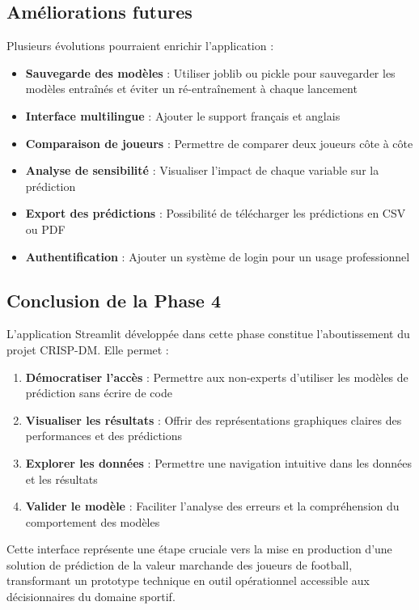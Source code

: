 \documentclass[12pt,a4paper]{article}
\begin{document}
\subsection{Améliorations futures}

Plusieurs évolutions pourraient enrichir l'application :

\begin{itemize}[leftmargin=*]
    \item \textbf{Sauvegarde des modèles} : Utiliser joblib ou pickle pour sauvegarder les modèles entraînés et éviter un ré-entraînement à chaque lancement
    \item \textbf{Interface multilingue} : Ajouter le support français et anglais
    \item \textbf{Comparaison de joueurs} : Permettre de comparer deux joueurs côte à côte
    \item \textbf{Analyse de sensibilité} : Visualiser l'impact de chaque variable sur la prédiction
    \item \textbf{Export des prédictions} : Possibilité de télécharger les prédictions en CSV ou PDF
    \item \textbf{Authentification} : Ajouter un système de login pour un usage professionnel
\end{itemize}

\subsection{Conclusion de la Phase 4}

L'application Streamlit développée dans cette phase constitue l'aboutissement du projet CRISP-DM. Elle permet :

\begin{enumerate}
    \item \textbf{Démocratiser l'accès} : Permettre aux non-experts d'utiliser les modèles de prédiction sans écrire de code
    \item \textbf{Visualiser les résultats} : Offrir des représentations graphiques claires des performances et des prédictions
    \item \textbf{Explorer les données} : Permettre une navigation intuitive dans les données et les résultats
    \item \textbf{Valider le modèle} : Faciliter l'analyse des erreurs et la compréhension du comportement des modèles
\end{enumerate}

Cette interface représente une étape cruciale vers la mise en production d'une solution de prédiction de la valeur marchande des joueurs de football, transformant un prototype technique en outil opérationnel accessible aux décisionnaires du domaine sportif.
\end{document}
